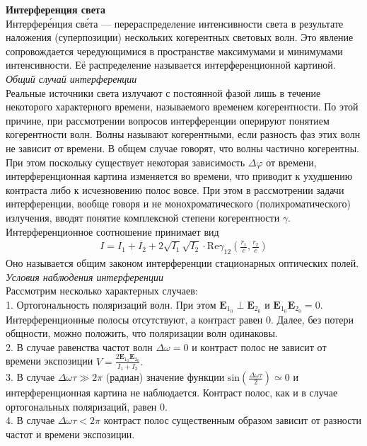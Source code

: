 \textbf{Интерференция света}\\
Интерфере́нция све́та — перераспределение интенсивности света в результате наложения (суперпозиции) нескольких когерентных световых волн. Это явление сопровождается чередующимися в пространстве максимумами и минимумами интенсивности. Её распределение называется интерференционной картиной.
\textit{Общий случай интерференции}\\
 Реальные источники света излучают с постоянной фазой лишь в течение некоторого характерного времени, называемого временем когерентности. По этой причине, при рассмотрении вопросов интерференции оперируют понятием когерентности волн. Волны называют когерентными, если разность фаз этих волн не зависит от времени. В общем случае говорят, что волны частично когерентны. При этом поскольку существует некоторая зависимость ${\mathbf  {}}\Delta \varphi$  от времени, интерференционная картина изменяется во времени, что приводит к ухудшению контраста либо к исчезновению полос вовсе. При этом в рассмотрении задачи интерференции, вообще говоря и не монохроматического (полихроматического) излучения, вводят понятие комплексной степени когерентности ${\mathbf  {}}\gamma$. Интерференционное соотношение принимает вид
\begin{gather*}
{\mathbf  {}}I=I_{1}+I_{2}+2{\sqrt  {I_{1}}}{\sqrt  {I_{2}}}\cdot {\mathrm  {Re}}{\gamma }_{{12}}({\frac  {r_{1}}{c}},{\frac  {r_{2}}{c}})
\end{gather*}
Оно называется общим законом интерференции стационарных оптических полей.
\textit{Условия наблюдения интерференции}\\
Рассмотрим несколько характерных случаев:\\
1. Ортогональность поляризаций волн.
При этом ${{\mathbf  E}}_{{1_{{0}}}}\perp {{\mathbf  E}}_{{2_{{0}}}}$  и   ${{\mathbf  E}}_{{1_{{0}}}}{{\mathbf  E}}_{{2_{{0}}}}=0$. Интерференционные полосы отсутствуют, а контраст равен 0. Далее, без потери общности, можно положить, что поляризации волн одинаковы.\\
2. В случае равенства частот волн ${\mathbf  {}}\Delta \omega = 0$ и контраст полос не зависит от времени экспозиции $V={\frac  {2{{\mathbf  E}}_{{1_{{0}}}}{{\mathbf  E}}_{{2_{{0}}}}}{I_{1}+I_{2}}}.$\\
3. В случае ${\mathbf  {}}\Delta \omega \tau \gg 2\pi$   (радиан) значение функции   ${\displaystyle \mathrm {sin} ({\frac {\Delta \omega \tau }{2}})\simeq 0}$  и интерференционная картина не наблюдается. Контраст полос, как и в случае ортогональных поляризаций, равен 0.\\
4. В случае ${\mathbf  {}}\Delta \omega \tau <2\pi$   контраст полос существенным образом зависит от разности частот и времени экспозиции.

